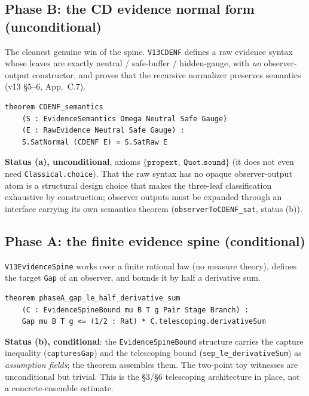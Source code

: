 \documentclass[11pt]{article}
\theoremstyle{definition}
\begin{document}
\subsection{Phase B: the CD evidence normal form (unconditional)}
The cleanest genuine win of the spine. \texttt{V13CDENF} defines a raw evidence
syntax whose leaves are exactly neutral / safe-buffer / hidden-gauge, with
\emph{no} observer-output constructor, and proves that the recursive normalizer
preserves semantics (v13 \S5--6, App.~C.7).
\begin{lstlisting}
theorem CDENF_semantics
    (S : EvidenceSemantics Omega Neutral Safe Gauge)
    (E : RawEvidence Neutral Safe Gauge) :
    S.SatNormal (CDENF E) = S.SatRaw E
\end{lstlisting}
\textbf{Status (a), unconditional}, axioms $\{\texttt{propext},\
\texttt{Quot.sound}\}$ (it does not even need \texttt{Classical.choice}). That the
raw syntax has no opaque observer-output atom is a structural design choice that
makes the three-leaf classification exhaustive by construction; observer outputs
must be expanded through an interface carrying its own semantics theorem
(\texttt{observerToCDENF\_sat}, status (b)).

\subsection{Phase A: the finite evidence spine (conditional)}
\texttt{V13EvidenceSpine} works over a finite rational law (no measure theory),
defines the target \texttt{Gap} of an observer, and bounds it by half a
derivative sum.
\begin{lstlisting}
theorem phaseA_gap_le_half_derivative_sum
    (C : EvidenceSpineBound mu B T g Pair Stage Branch) :
    Gap mu B T g <= (1/2 : Rat) * C.telescoping.derivativeSum
\end{lstlisting}
\textbf{Status (b), conditional}: the \texttt{EvidenceSpineBound} structure carries
the capture inequality (\texttt{capturesGap}) and the telescoping bound
(\texttt{sep\_le\_derivativeSum}) as \emph{assumption fields}; the theorem
assembles them. The two-point toy witnesses are unconditional but trivial. This is
the \S3/\S6 telescoping architecture in place, not a concrete-ensemble estimate.
\end{document}
